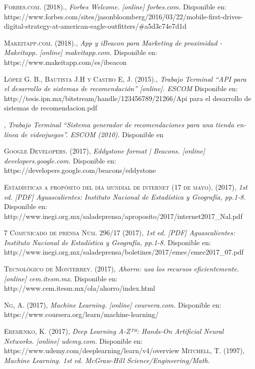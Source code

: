 \begin{thebibliography}{}
 \textsc{Forbes.com. (2018).}, 
\textit{Forbes Welcome. [online] forbes.com.}
Disponible en: https://www.forbes.com/sites/jasonbloomberg/2016/03/22/mobile-first-drives-digital-strategy-at-american-eagle-outfitters/\#a5d3c74e7d1d

 \textsc{Makeitapp.com. (2018).}, 
\textit{App y iBeacon para Marketing de proximidad - Makeitapp. [online] makeitapp.com. }
Disponible en: https://www.makeitapp.com/es/ibeacon

 \textsc{López G. B., Bautista J.H y Castro E, J. (2015).}, 
\textit{Trabajo Terminal ``API para el desarrollo de sistemas de recomendación'' [online]. ESCOM}
Disponible en: http://tesis.ipn.mx/bitstream/handle/123456789/21266/Api para el desarrollo de sistemas de recomendacion.pdf

 \textsc{}, 
\textit{Trabajo Terminal ``Sistema generador de recomendaciones para una tienda en-línea de videojuegos''. ESCOM (2010).}
Disponible en 

 \textsc{Google Developers. (2017)},
\textit{Eddystone format | Beacons. [online] developers.google.com.}
Disponible en: https://developers.google.com/beacons/eddystone 

 \textsc{Estadísticas a propósito del día mundial de internet (17 de mayo). (2017)},
\textit{1st ed. [PDF] Aguascalientes: Instituto Nacional de Estadística y Geografía, pp.1-8.}
Disponible en: http://www.inegi.org.mx/saladeprensa/aproposito/2017/internet2017\_Nal.pdf

 \textsc{7 Comunicado de prensa Núm. 296/17 (2017)},
\textit{1st ed. [PDF] Aguascalientes: Instituto Nacional de Estadística y Geografía, pp.1-8.}
Disponible en: http://www.inegi.org.mx/saladeprensa/boletines/2017/emec/emec2017\_07.pdf

 \textsc{Tecnológico de Monterrey. (2017)},
\textit{Ahorro: usa los recursos eficientemente. [online] cem.itesm.mx.}
Disponible en: http://www.cem.itesm.mx/ola/ahorro/index.html

 \textsc{Ng, A. (2017)},
\textit{Machine Learning. [online] coursera.com.}
Disponible en: https://www.coursera.org/learn/machine-learning/

 \textsc{Eremenko, K. (2017)},
\textit{Deep Learning A-Z™: Hands-On Artificial Neural Networks. [online] udemy.com.}
Disponible en: https://www.udemy.com/deeplearning/learn/v4/overview 
 \textsc{Mitchell, T. (1997)},
\textit{Machine Learning. 1st ed. McGraw-Hill Science/Engineering/Math.}


\end{thebibliography}
